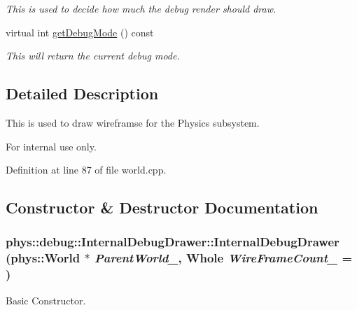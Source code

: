\begin{DoxyCompactItemize}
\begin{DoxyCompactList}\small\item\em This is used to decide how much the debug render should draw. \item\end{DoxyCompactList}\item 
virtual int \hyperlink{classphys_1_1debug_1_1InternalDebugDrawer_aba329861569d741e970ce5aafb668e84}{getDebugMode} () const 
\begin{DoxyCompactList}\small\item\em This will return the current debug mode. \item\end{DoxyCompactList}\end{DoxyCompactItemize}


\subsection{Detailed Description}
This is used to draw wireframse for the Physics subsystem. \begin{DoxyInternal}{For internal use only.}
\end{DoxyInternal}


Definition at line 87 of file world.cpp.



\subsection{Constructor \& Destructor Documentation}
\hypertarget{classphys_1_1debug_1_1InternalDebugDrawer_a0e701e00e1080fdadfcf35e9051789a3}{
\subsubsection[{InternalDebugDrawer}]{\setlength{\rightskip}{0pt plus 5cm}phys::debug::InternalDebugDrawer::InternalDebugDrawer ({\bf phys::World} $\ast$ {\em ParentWorld\_\-}, \/  {\bf Whole} {\em WireFrameCount\_\-} = {})}}
\label{db/d27/classphys_1_1debug_1_1InternalDebugDrawer_a0e701e00e1080fdadfcf35e9051789a3}


Basic Constructor. 

